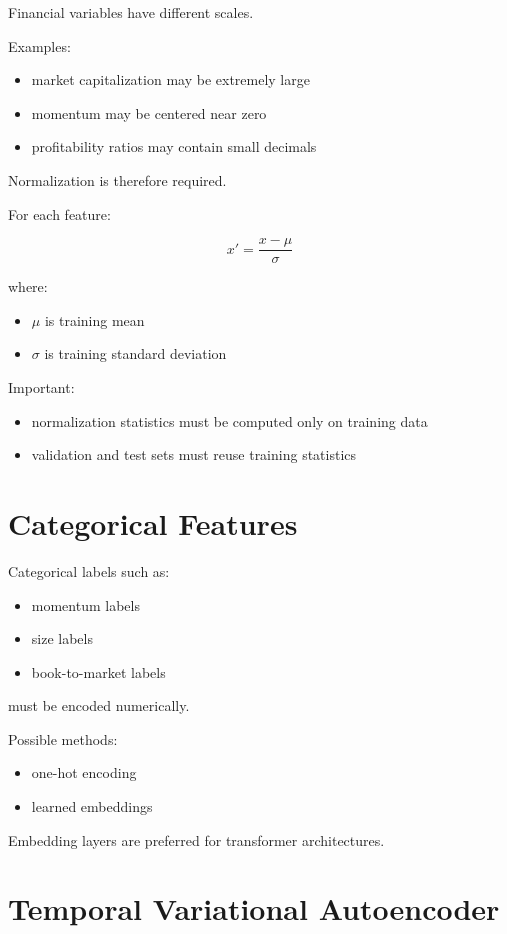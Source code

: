 \documentclass[11pt]{article}
\begin{document}
Financial variables have different scales.

Examples:
\begin{itemize}
    \item market capitalization may be extremely large
    \item momentum may be centered near zero
    \item profitability ratios may contain small decimals
\end{itemize}

Normalization is therefore required.

For each feature:

\[
x' =
\frac{x - \mu}{\sigma}
\]

where:
\begin{itemize}
    \item $\mu$ is training mean
    \item $\sigma$ is training standard deviation
\end{itemize}

Important:
\begin{itemize}
    \item normalization statistics must be computed only on training data
    \item validation and test sets must reuse training statistics
\end{itemize}

\section{Categorical Features}

Categorical labels such as:
\begin{itemize}
    \item momentum labels
    \item size labels
    \item book-to-market labels
\end{itemize}

must be encoded numerically.

Possible methods:
\begin{itemize}
    \item one-hot encoding
    \item learned embeddings
\end{itemize}

Embedding layers are preferred for transformer architectures.

\section{Temporal Variational Autoencoder}
\end{document}
